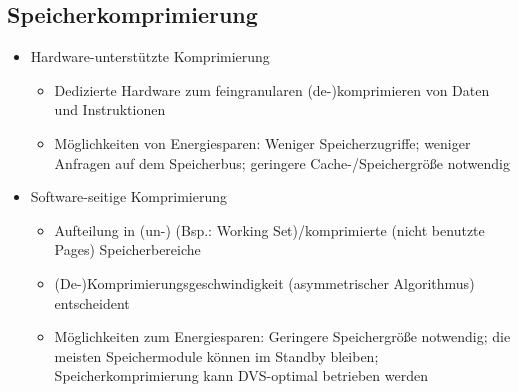 \subsection{Speicherkomprimierung} %
\begin{itemize}
	\item Hardware-unterstützte Komprimierung
	\begin{itemize}
		\item Dedizierte Hardware zum feingranularen (de-)komprimieren von Daten und Instruktionen
		\item Möglichkeiten von Energiesparen: Weniger Speicherzugriffe; weniger Anfragen auf dem Speicherbus; geringere Cache-/Speichergröße notwendig
	\end{itemize}
	\item Software-seitige Komprimierung
	\begin{itemize}
		\item Aufteilung in (un-) (Bsp.: Working Set)/komprimierte (nicht benutzte Pages) Speicherbereiche
		\item (De-)Komprimierungsgeschwindigkeit (asymmetrischer Algorithmus) entscheident
		\item Möglichkeiten zum Energiesparen: Geringere Speichergröße notwendig; die meisten Speichermodule können im Standby bleiben; Speicherkomprimierung kann DVS-optimal betrieben werden
	\end{itemize}
\end{itemize}



